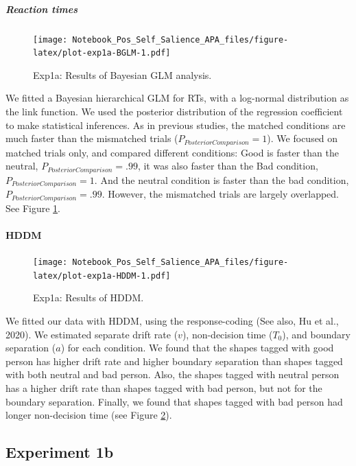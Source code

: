 \documentclass[
  english,
  man]{apa6}
\let\oldparagraph\paragraph
\renewcommand{\paragraph}[1]{\oldparagraph{#1}\mbox{}}
\let\oldsubparagraph\subparagraph
\renewcommand{\subparagraph}[1]{\oldsubparagraph{#1}\mbox{}}
\begin{document}
\hypertarget{reaction-times-1}{%
\subparagraph{Reaction times}\label{reaction-times-1}}

\begin{figure}
\centering
\texttt{[image: Notebook\_Pos\_Self\_Salience\_APA\_files/figure-latex/plot-exp1a-BGLM-1.pdf]}
\caption{\label{fig:plot-exp1a-BGLM}Exp1a: Results of Bayesian GLM analysis.}
\end{figure}

We fitted a Bayesian hierarchical GLM for RTs, with a log-normal distribution as the link function. We used the posterior distribution of the regression coefficient to make statistical inferences. As in previous studies, the matched conditions are much faster than the mismatched trials (\(P_{PosteriorComparison} = 1\)). We focused on matched trials only, and compared different conditions: Good is faster than the neutral, \(P_{PosteriorComparison} = .99\), it was also faster than the Bad condition, \(P_{PosteriorComparison} = 1\). And the neutral condition is faster than the bad condition, \(P_{PosteriorComparison} = .99\). However, the mismatched trials are largely overlapped. See Figure \ref{fig:plot-exp1a-BGLM}.

\hypertarget{hddm}{%
\paragraph{HDDM}\label{hddm}}

\begin{figure}
\centering
\texttt{[image: Notebook\_Pos\_Self\_Salience\_APA\_files/figure-latex/plot-exp1a-HDDM-1.pdf]}
\caption{\label{fig:plot-exp1a-HDDM}Exp1a: Results of HDDM.}
\end{figure}

We fitted our data with HDDM, using the response-coding (See also, Hu et al., 2020). We estimated separate drift rate (\(v\)), non-decision time (\(T_{0}\)), and boundary separation (\(a\)) for each condition. We found that the shapes tagged with good person has higher drift rate and higher boundary separation than shapes tagged with both neutral and bad person. Also, the shapes tagged with neutral person has a higher drift rate than shapes tagged with bad person, but not for the boundary separation. Finally, we found that shapes tagged with bad person had longer non-decision time (see Figure \ref{fig:plot-exp1a-HDDM}).

\hypertarget{experiment-1b}{%
\subsection{Experiment 1b}\label{experiment-1b}}
\end{document}
